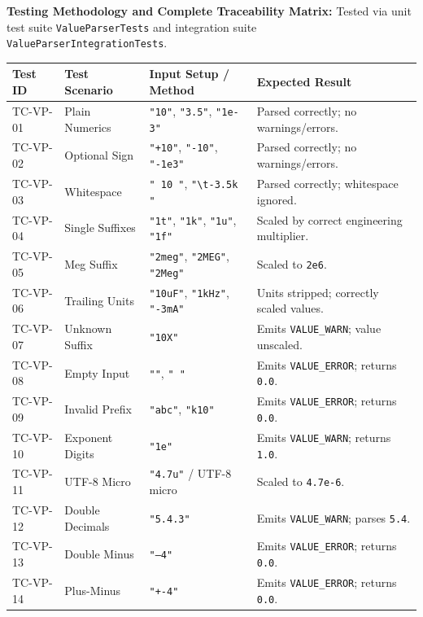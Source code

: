 \textbf{Testing Methodology and Complete Traceability Matrix:} Tested via unit test suite \texttt{ValueParserTests} and integration suite \texttt{ValueParserIntegrationTests}.
\newpage
\begin{table}[H]
\centering
\small
\begin{tabular}{|l|l|p{4.5cm}|p{4.5cm}|}
\hline
\textbf{Test ID} & \textbf{Test Scenario} & \textbf{Input Setup / Method} & \textbf{Expected Result} \\
\hline
TC-VP-01 & Plain Numerics & \texttt{"10"}, \texttt{"3.5"}, \texttt{"1e-3"} & Parsed correctly; no warnings/errors. \\
\hline
TC-VP-02 & Optional Sign & \texttt{"+10"}, \texttt{"-10"}, \texttt{"-1e3"} & Parsed correctly; no warnings/errors. \\
\hline
TC-VP-03 & Whitespace & \texttt{"   10   "}, \texttt{"\textbackslash t-3.5k  "} & Parsed correctly; whitespace ignored. \\
\hline
TC-VP-04 & Single Suffixes & \texttt{"1t"}, \texttt{"1k"}, \texttt{"1u"}, \texttt{"1f"} & Scaled by correct engineering multiplier. \\
\hline
TC-VP-05 & Meg Suffix & \texttt{"2meg"}, \texttt{"2MEG"}, \texttt{"2Meg"} & Scaled to \texttt{2e6}. \\
\hline
TC-VP-06 & Trailing Units & \texttt{"10uF"}, \texttt{"1kHz"}, \texttt{"-3mA"} & Units stripped; correctly scaled values. \\
\hline
TC-VP-07 & Unknown Suffix & \texttt{"10X"} & Emits \texttt{VALUE\_WARN}; value unscaled. \\
\hline
TC-VP-08 & Empty Input & \texttt{""}, \texttt{"   "} & Emits \texttt{VALUE\_ERROR}; returns \texttt{0.0}. \\
\hline
TC-VP-09 & Invalid Prefix & \texttt{"abc"}, \texttt{"k10"} & Emits \texttt{VALUE\_ERROR}; returns \texttt{0.0}. \\
\hline
TC-VP-10 & Exponent Digits & \texttt{"1e"} & Emits \texttt{VALUE\_WARN}; returns \texttt{1.0}. \\
\hline
TC-VP-11 & UTF-8 Micro & \texttt{"4.7u"} / UTF-8 micro & Scaled to \texttt{4.7e-6}. \\
\hline
TC-VP-12 & Double Decimals & \texttt{"5.4.3"} & Emits \texttt{VALUE\_WARN}; parses \texttt{5.4}. \\
\hline
TC-VP-13 & Double Minus & \texttt{"--4"} & Emits \texttt{VALUE\_ERROR}; returns \texttt{0.0}. \\
\hline
TC-VP-14 & Plus-Minus & \texttt{"+-4"} & Emits \texttt{VALUE\_ERROR}; returns \texttt{0.0}. \\

\end{tabular}
\end{table}

